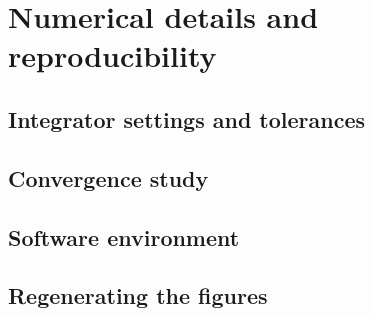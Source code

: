 \section{Numerical details and reproducibility}\label{app:numerics}

\subsection{Integrator settings and tolerances}
\subsection{Convergence study}
\subsection{Software environment}
\subsection{Regenerating the figures}
